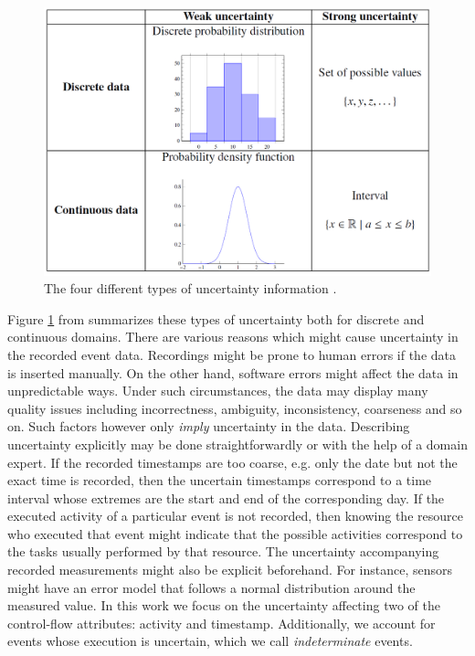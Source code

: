 \begin{figure}[htp]
  \centering
 \includegraphics[width=12cm]{figures/unctypes.png}
	\caption{The four different types of uncertainty information \cite{conformance}.}
	\label{fig: uncertainty types}
\end{figure}
%
%
%
%
%
Figure \ref{fig: uncertainty types} from \cite{conformance} summarizes these types of uncertainty both for discrete and continuous domains.
There are various reasons which might cause uncertainty in the recorded event data.
Recordings might be prone to human errors if the data is inserted manually.
On the other hand, software errors might affect the data in unpredictable ways.
Under such circumstances, the data may display many quality issues including incorrectness, ambiguity, inconsistency, coarseness and so on.
Such factors however only \textit{imply} uncertainty in the data.
Describing uncertainty explicitly may be done straightforwardly or with the help of a domain expert.
If the recorded timestamps are too coarse, e.g. only the date but not the exact time is recorded, then the uncertain timestamps correspond to a time interval whose extremes are the start and end of the corresponding day.
If the executed activity of a particular event is not recorded, then knowing the resource who executed that event might indicate that the possible activities correspond to the tasks usually performed by that resource.
The uncertainty accompanying recorded measurements might also be explicit beforehand.
For instance, sensors might have an error model that follows a normal distribution around the measured value.
In this work we focus on the uncertainty affecting two of the control-flow attributes: activity and timestamp.
Additionally, we account for events whose execution is uncertain, which we call \textit{indeterminate} events.
